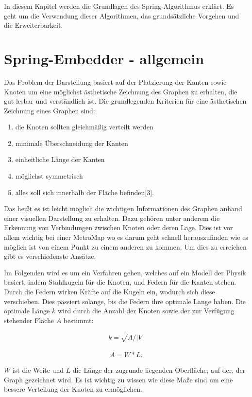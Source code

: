 In diesem Kapitel werden die Grundlagen des Spring-Algorithmus erklärt. 
Es geht um die Verwendung dieser Algorithmen, das grundsätzliche Vorgehen
und die Erweiterbarkeit.

\section{Spring-Embedder - allgemein}
\label{Kapitel_3_-_Unterkapitel_2}


Das Problem der Darstellung basiert auf der Platzierung der Kanten sowie
Knoten um eine möglichst ästhetische Zeichnung des
Graphen zu erhalten, die gut lesbar und verständlich ist. Die grundlegenden Kriterien für eine ästhetischen Zeichnung eines Graphen sind:
\begin{enumerate}
	\item die Knoten sollten gleichmäßig verteilt werden
	\item minimale Überschneidung der Kanten
	\item einheitliche Länge der Kanten
	\item möglichst symmetrisch
	\item alles soll sich innerhalb der Fläche befinden[3].
\end{enumerate}   

Das heißt es ist leicht möglich
die wichtigen Informationen des Graphen anhand einer visuellen Darstellung zu erhalten. 
Dazu gehören unter anderem die Erkennung von Verbindungen zwischen Knoten oder deren Lage. Dies
ist vor allem wichtig bei einer MetroMap wo es darum geht schnell herauszufinden wie es möglich ist
von einem Punkt zu einem anderen zu kommen.
Um dies zu erreichen gibt es verschiedenste Ansätze.

Im Folgenden wird es um ein Verfahren gehen, welches auf ein Modell
der Physik basiert, indem Stahlkugeln für die Knoten, und Federn für die Kanten stehen. Durch die 
Federn wirken Kräfte auf die Kugeln ein, wodurch sich diese verschieben. Dies passiert solange, 
bis die Federn ihre optimale Länge haben. Die optimale Länge $k$ wird durch die Anzahl der Knoten sowie
der zur Verfügung stehender Fläche $A$ bestimmt:

\begin{align}
	k =
	\sqrt{A / |V|}
\end{align}

\begin{align}
	A =
	W * L.
\end{align}

$W$ ist die Weite und $L$ die Länge der zugrunde liegenden Oberfläche, auf der, der Graph gezeichnet wird. Es ist
wichtig zu wissen wie diese Maße sind um eine bessere Verteilung der Knoten zu ermöglichen. 

